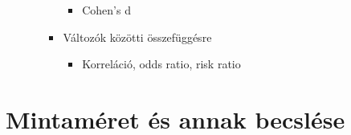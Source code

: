\documentclass[
  letterpaper,
  DIV=11,
  numbers=noendperiod]{scrreprt}
\providecommand{\tightlist}{%
  \setlength{\itemsep}{0pt}\setlength{\parskip}{0pt}}\usepackage{longtable,booktabs,array}
\begin{document}
\begin{itemize}
\begin{itemize}
\begin{itemize}
      \begin{itemize}
      \tightlist
      \item
        Cohen's d
      \end{itemize}
    \item
      Változók közötti összefüggésre

      \begin{itemize}
      \tightlist
      \item
        Korreláció, odds ratio, risk ratio
      \end{itemize}
    \end{itemize}
  \end{itemize}
\end{itemize}

\hypertarget{mintamuxe9ret-uxe9s-annak-becsluxe9se}{%
\section{Mintaméret és annak
becslése}\label{mintamuxe9ret-uxe9s-annak-becsluxe9se}}
\end{document}
